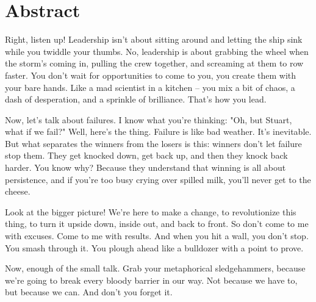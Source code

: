 \clearpage
\chapter*{Abstract}
Right, listen up! Leadership isn’t about sitting around and letting the ship sink while you twiddle your thumbs. No, leadership is about grabbing the wheel when the storm’s coming in, pulling the crew together, and screaming at them to row faster. You don’t wait for opportunities to come to you, you create them with your bare hands. Like a mad scientist in a kitchen – you mix a bit of chaos, a dash of desperation, and a sprinkle of brilliance. That’s how you lead.

Now, let’s talk about failures. I know what you’re thinking: "Oh, but Stuart, what if we fail?" Well, here’s the thing. Failure is like bad weather. It’s inevitable. But what separates the winners from the losers is this: winners don’t let failure stop them. They get knocked down, get back up, and then they knock back harder. You know why? Because they understand that winning is all about persistence, and if you’re too busy crying over spilled milk, you’ll never get to the cheese.

Look at the bigger picture! We’re here to make a change, to revolutionize this thing, to turn it upside down, inside out, and back to front. So don’t come to me with excuses. Come to me with results. And when you hit a wall, you don’t stop. You smash through it. You plough ahead like a bulldozer with a point to prove.

Now, enough of the small talk. Grab your metaphorical sledgehammers, because we’re going to break every bloody barrier in our way. Not because we have to, but because we can. And don’t you forget it.

